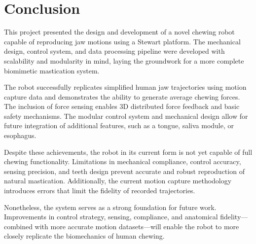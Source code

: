 \section{Conclusion}

This project presented the design and development of a novel chewing robot capable of reproducing jaw motions using a Stewart platform. 
The mechanical design, control system, and data processing pipeline were developed with scalability and modularity in mind, laying the 
groundwork for a more complete biomimetic mastication system.

The robot successfully replicates simplified human jaw trajectories using motion capture data and demonstrates the ability to generate average chewing forces. 
The inclusion of force sensing enables 3D distributed force feedback and basic safety mechanisms.
The modular control system and mechanical design allow for future integration of additional features, such as a tongue, saliva 
module, or esophagus.

Despite these achievements, the robot in its current form is not yet capable of full chewing functionality. Limitations in mechanical compliance, 
control accuracy, sensing precision, and teeth design prevent accurate and robust reproduction of natural mastication. Additionally, the current 
motion capture methodology introduces errors that limit the fidelity of recorded trajectories.

Nonetheless, the system serves as a strong foundation for future work. Improvements in control strategy, sensing, compliance, and anatomical 
fidelity—combined with more accurate motion datasets—will enable the robot to more closely replicate the biomechanics of human chewing. 
